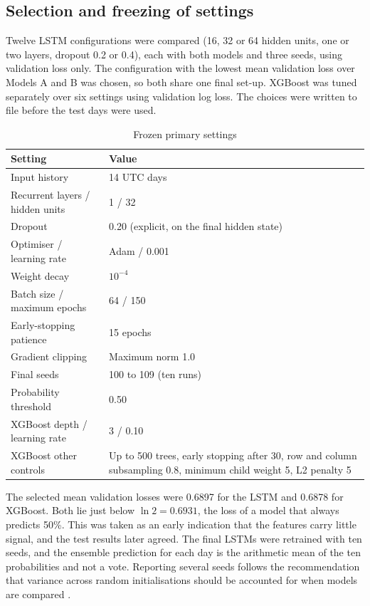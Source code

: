 \subsection{Selection and freezing of settings}
Twelve LSTM configurations were compared (16, 32 or 64 hidden units, one or two layers, dropout 0.2 or 0.4), each with both models and three seeds, using validation loss only. The configuration with the lowest mean validation loss over Models A and B was chosen, so both share one final set-up. XGBoost was tuned separately over six settings using validation log loss. The choices were written to file before the test days were used.

\begin{table}[htbp]\centering\small
\caption{Frozen primary settings}\label{tab:hyperparams}
\begin{tabularx}{\textwidth}{p{4.1cm}X}
\toprule
Setting & Value\\\midrule
Input history & 14 UTC days\\
Recurrent layers / hidden units & 1 / 32\\
Dropout & 0.20 (explicit, on the final hidden state)\\
Optimiser / learning rate & Adam / 0.001\\
Weight decay & $10^{-4}$\\
Batch size / maximum epochs & 64 / 150\\
Early-stopping patience & 15 epochs\\
Gradient clipping & Maximum norm 1.0\\
Final seeds & 100 to 109 (ten runs)\\
Probability threshold & 0.50\\
XGBoost depth / learning rate & 3 / 0.10\\
XGBoost other controls & Up to 500 trees, early stopping after 30, row and column subsampling 0.8, minimum child weight 5, L2 penalty 5\\
\bottomrule
\end{tabularx}
\end{table}

The selected mean validation losses were 0.6897 for the LSTM and 0.6878 for XGBoost. Both lie just below $\ln 2 = 0.6931$, the loss of a model that always predicts 50\%. This was taken as an early indication that the features carry little signal, and the test results later agreed. The final LSTMs were retrained with ten seeds, and the ensemble prediction for each day is the arithmetic mean of the ten probabilities and not a vote. Reporting several seeds follows the recommendation that variance across random initialisations should be accounted for when models are compared \cite{bouthillier2021}.

